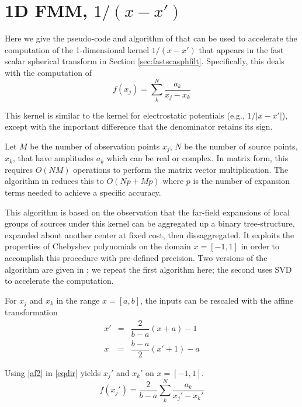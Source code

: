 

\clearpage
\newpage

\section{1D FMM, $1/(x-x')$}
\label{sec:1dfmm}

Here we give the pseudo-code and algorithm of \cite{dutt1996fast} that can be used to accelerate the computation of the 1-dimensional kernel $1/(x-x')$ that appears in the fast scalar spherical transform in Section \ref{sec:fastscasphfilt}. Specifically, this deals with the computation of
\begin{equation}
f(x_j) = \sum_k^N \dfrac{a_k}{x_j - x_k} \label{eqdir}
\end{equation}

This kernel is similar to the kernel for electrostatic potentials (e.g., $1/\vert x - x'\vert$), except with the important difference that the denominator retains its sign.  

Let $M$ be the number of observation points $x_j$, $N$ be the number of source points, $x_k$, that have amplitudes $a_k$ which can be real or complex. In matrix form, this requires $O(NM)$ operations to perform the matrix vector multiplication.  The algorithm in \cite{dutt1996fast} reduces this to $O(Np + Mp)$ where $p$ is the number of expansion terms needed to achieve a specific accuracy.  

This algorithm is based on the observation that the far-field expansions of local groups of sources under this kernel can be aggregated up a binary tree-structure, expanded about another center at fixed cost, then dissaggregated. It exploits the properties of Chebyshev polynomials on the domain $x = [-1,1]$ in order to accomplish this procedure with pre-defined precision.  Two versions of the algorithm are given in \cite{dutt1996fast}; we repeat the first algorithm here; the second uses SVD to accelerate the computation. 

For $x_j$ and $x_k$ in the range $x = [a, b]$, the inputs can be rescaled with the affine transformation
\begin{eqnarray}
x' &=& \dfrac{2}{b-a}(x + a) -1 \label{af1} \\
x &=& \dfrac{b-a}{2}(x' + 1) - a \label{af2}
\end{eqnarray}

Using \eqref{af2} in \eqref{eqdir} yields $x_j'$ and $x_k'$ on $x = [-1, 1]$.  
\begin{equation}
f(x_j') = \dfrac{2}{b-a}\sum_k^N \dfrac{a_k}{x_j' - x_k'}
\end{equation}

